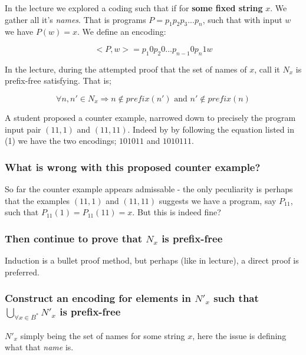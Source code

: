 \documentclass{article}
\begin{document}
In the lecture we explored a coding such that if for \textbf{some fixed string} $x$. We gather all it's \emph{names}. That is programs $P = p_1p_2p_3...p_n$, such that with input $w$ we have $P(w) = x$. We define an encoding:

\begin{equation}
<P, w> = p_{1}0p_{2}0...p_{n-1}0p_{n}1w
\end{equation}

In the lecture, during the attempted proof that the set of names of $x$, call it $N_x$ is prefix-free satisfying. That is; 

\begin{equation}
\forall n,n' \in N_x \Rightarrow n \not\in prefix(n') \text{ and } n' \not\in prefix(n)
\end{equation}

A student proposed a counter example, narrowed down to precisely the program input pair $(11, 1)$ and $(11, 11)$. Indeed by by following the equation listed in (1) we have the two encodings; $101011$ and $1010111$.

\subsubsection*{What is wrong with this proposed counter example?}
So far the counter example appears admissable - the only peculiarity is perhaps that the examples $(11, 1)$ and $(11, 11)$ suggests we have a program, say $P_{11}$, such that $P_{11}(1) = P_{11}(11) = x$. But this is indeed fine?

\subsubsection*{Then continue to prove that $N_x$ is prefix-free}
Induction is a bullet proof method, but perhaps (like in lecture), a direct proof is preferred.

\subsubsection*{Construct an encoding for elements in $N'_x$ such that $\bigcup_{\forall x \in B^*}N'_x$ is prefix-free}
$N'_x$ simply being the set of names for some string $x$, here the issue is defining what that \emph{name} is.
\end{document}
